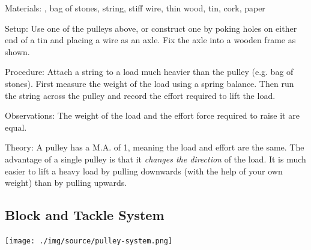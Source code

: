 \begin{multicols}{2}
\begin{description*}
\item[Materials:]{, bag of stones, string, stiff wire, thin wood, tin, cork, paper}
\item[Setup:]{Use one of the pulleys above, or construct one by poking holes on either end of a tin and placing a wire as an axle. Fix the axle into a wooden frame as shown.}
\item[Procedure:]{Attach a string to a load much heavier than the pulley (e.g. bag of stones). First measure the weight of the load using a spring balance. Then run the string across the pulley and record the effort required to lift the load.}
\item[Observations:]{The weight of the load and the effort force required to raise it are equal.}
\item[Theory:]{A pulley has a M.A. of 1, meaning the load and effort are the same. The advantage of a single pulley is that it \emph{changes the direction} of the load. It is much easier to lift a heavy load by pulling downwards (with the help of your own weight) than by pulling upwards.}
\end{description*}

\vfill
\columnbreak

\subsection{Block and Tackle System}

\begin{center}
\texttt{[image: ./img/source/pulley-system.png]}
\end{center}


\end{multicols}
